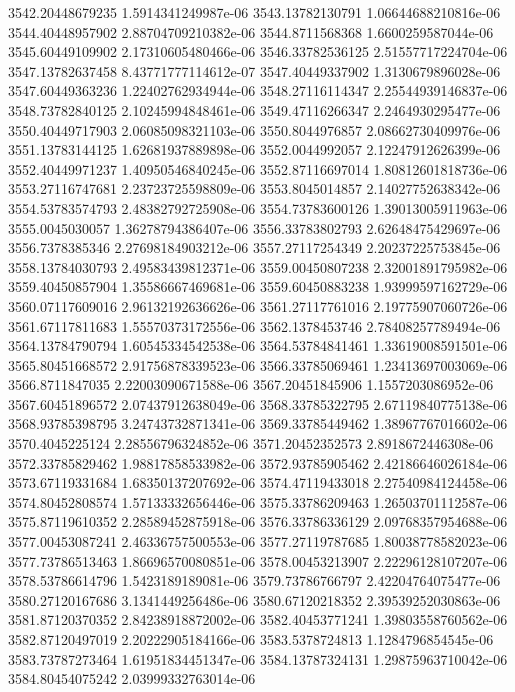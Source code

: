 {3542.20448679235 1.5914341249987e-06
3543.13782130791 1.06644688210816e-06
3544.40448957902 2.88704709210382e-06
3544.8711568368 1.6600259587044e-06
3545.60449109902 2.17310605480466e-06
3546.33782536125 2.51557717224704e-06
3547.13782637458 8.43771777114612e-07
3547.40449337902 1.3130679896028e-06
3547.60449363236 1.22402762934944e-06
3548.27116114347 2.25544939146837e-06
3548.73782840125 2.10245994848461e-06
3549.47116266347 2.2464930295477e-06
3550.40449717903 2.06085098321103e-06
3550.8044976857 2.08662730409976e-06
3551.13783144125 1.62681937889898e-06
3552.0044992057 2.12247912626399e-06
3552.40449971237 1.40950546840245e-06
3552.87116697014 1.80812601818736e-06
3553.27116747681 2.23723725598809e-06
3553.8045014857 2.14027752638342e-06
3554.53783574793 2.48382792725908e-06
3554.73783600126 1.39013005911963e-06
3555.0045030057 1.36278794386407e-06
3556.33783802793 2.62648475429697e-06
3556.7378385346 2.27698184903212e-06
3557.27117254349 2.20237225753845e-06
3558.13784030793 2.49583439812371e-06
3559.00450807238 2.32001891795982e-06
3559.40450857904 1.35586667469681e-06
3559.60450883238 1.93999597162729e-06
3560.07117609016 2.96132192636626e-06
3561.27117761016 2.19775907060726e-06
3561.67117811683 1.55570373172556e-06
3562.1378453746 2.78408257789494e-06
3564.13784790794 1.60545334542538e-06
3564.53784841461 1.33619008591501e-06
3565.80451668572 2.91756878339523e-06
3566.33785069461 1.23413697003069e-06
3566.8711847035 2.22003090671588e-06
3567.20451845906 1.1557203086952e-06
3567.60451896572 2.07437912638049e-06
3568.33785322795 2.67119840775138e-06
3568.93785398795 3.24743732871341e-06
3569.33785449462 1.38967767016602e-06
3570.4045225124 2.28556796324852e-06
3571.20452352573 2.8918672446308e-06
3572.33785829462 1.98817858533982e-06
3572.93785905462 2.42186646026184e-06
3573.67119331684 1.68350137207692e-06
3574.47119433018 2.27540984124458e-06
3574.80452808574 1.57133332656446e-06
3575.33786209463 1.26503701112587e-06
3575.87119610352 2.28589452875918e-06
3576.33786336129 2.09768357954688e-06
3577.00453087241 2.46336757500553e-06
3577.27119787685 1.80038778582023e-06
3577.73786513463 1.86696570080851e-06
3578.00453213907 2.22296128107207e-06
3578.53786614796 1.5423189189081e-06
3579.73786766797 2.42204764075477e-06
3580.27120167686 3.1341449256486e-06
3580.67120218352 2.39539252030863e-06
3581.87120370352 2.84238918872002e-06
3582.40453771241 1.39803558760562e-06
3582.87120497019 2.20222905184166e-06
3583.5378724813 1.1284796854545e-06
3583.73787273464 1.61951834451347e-06
3584.13787324131 1.29875963710042e-06
3584.80454075242 2.03999332763014e-06
}
